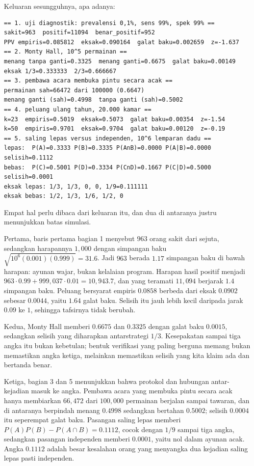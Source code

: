 Keluaran sesungguhnya, apa adanya:

    \begin{verbatim}
== 1. uji diagnostik: prevalensi 0,1%, sens 99%, spek 99% ==
sakit=963  positif=11094  benar_positif=952
PPV empiris=0.085812  eksak=0.090164  galat baku=0.002659  z=-1.637
== 2. Monty Hall, 10^5 permainan ==
menang tanpa ganti=0.3325  menang ganti=0.6675  galat baku=0.00149
eksak 1/3=0.333333  2/3=0.666667
== 3. pembawa acara membuka pintu secara acak ==
permainan sah=66472 dari 100000 (0.6647)
menang ganti (sah)=0.4998  tanpa ganti (sah)=0.5002
== 4. peluang ulang tahun, 20.000 kamar ==
k=23  empiris=0.5019  eksak=0.5073  galat baku=0.00354  z=-1.54
k=50  empiris=0.9701  eksak=0.9704  galat baku=0.00120  z=-0.19
== 5. saling lepas versus independen, 10^6 lemparan dadu ==
lepas:  P(A)=0.3333 P(B)=0.3335 P(AnB)=0.0000 P(A|B)=0.0000 selisih=0.1112
bebas:  P(C)=0.5001 P(D)=0.3334 P(CnD)=0.1667 P(C|D)=0.5000 selisih=0.0001
eksak lepas: 1/3, 1/3, 0, 0, 1/9=0.111111
eksak bebas: 1/2, 1/3, 1/6, 1/2, 0
\end{verbatim}    

Empat hal perlu dibaca dari keluaran itu, dan dua di antaranya justru menunjukkan batas
simulasi.

Pertama, baris pertama bagian 1 menyebut $963$ orang sakit dari sejuta, sedangkan
harapannya $1{,}000$ dengan simpangan baku $\sqrt{10^{6}(0.001)(0.999)}=31.6$. Jadi
$963$ berada $1.17$ simpangan baku di bawah harapan: ayunan wajar, bukan kelalaian
program. Harapan hasil positif menjadi $963\cdot 0.99+999{,}037\cdot 0.01=10{,}943.7$,
dan yang teramati $11{,}094$ berjarak $1.4$ simpangan baku. Peluang bersyarat empiris
$0.0858$ berbeda dari eksak $0.0902$ sebesar $0.0044$, yaitu $1.64$ galat baku. Selisih
itu jauh lebih kecil daripada jarak $0.09$ ke $1$, sehingga tafsirnya tidak berubah.

Kedua, Monty Hall memberi $0.6675$ dan $0.3325$ dengan galat baku $0.0015$, sedangkan
selisih yang diharapkan antarstrategi $1/3$. Kesepakatan sampai tiga angka itu bukan
kebetulan; bentuk verifikasi yang paling berguna memang bukan memastikan angka ketiga,
melainkan memastikan selisih yang kita klaim ada dan bertanda benar.

Ketiga, bagian 3 dan 5 menunjukkan bahwa protokol dan hubungan antar-kejadian masuk ke
angka. Pembawa acara yang membuka pintu secara acak hanya membiarkan $66{,}472$ dari
$100{,}000$ permainan berjalan sampai tawaran, dan di antaranya berpindah menang
$0.4998$ sedangkan bertahan $0.5002$; selisih $0.0004$ itu seperempat galat baku.
Pasangan saling lepas memberi $P(A)P(B)-P(A\cap B)=0.1112$, cocok dengan $1/9$ sampai
tiga angka, sedangkan pasangan independen memberi $0.0001$, yaitu nol dalam ayunan acak.
Angka $0.1112$ adalah besar kesalahan orang yang menyangka dua kejadian saling lepas
pasti independen.

